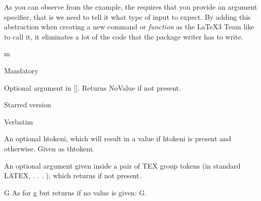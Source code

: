 \DeclareDocumentCommand{}


\begin{flushleft}
\par
\end{flushleft}
As you can observe from the example, the  requires
that you provide an argument specifier, that is we need to tell it what type of
input to expect. By adding this abstraction when creating a new command or
\textit{function} as the LaTeX3 Team like to call it, it eliminates a lot of the
code that the package writer has to write. 



\begin{argumentlist}{m}
\item [m] Mandatory
\item [o] Optional argument in  []. Returns NoValue if not present.
\item [O] 
\item [s] Starred version
\item [v] Verbatim
\item [l]
\item [u]
\item [d]
\item [D] 
\item [t]  An optional htokeni, which will result in a value  if htokeni is 
            present and  otherwise. Given as thtokeni.
\item [g] An optional argument given inside a pair of TEX group tokens (in standard LATEX,
              { . . . }), which returns  if not present.
\item [G] G As for g but returns  if no value is given: G.
\end{argumentlist}











